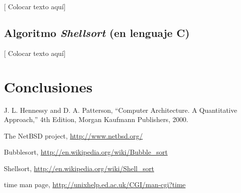 \documentclass{article}
\begin{document}
	[ Colocar texto aquí]

\lstset{ language = C } %
 
\bigskip\bigskip


\lstset{ language = C } %
 
\bigskip\bigskip




\subsection{Algoritmo \textit{Shellsort} (en lenguaje C)}

	[ Colocar texto aquí]

\lstset{ language = C } %
 
\bigskip\bigskip


\lstset{ language = C } %
 
\bigskip\bigskip




\section{Conclusiones}


\bigskip





\begin{thebibliography}{99}

	 J. L. Hennessy and D. A. Patterson, ``Computer Architecture. A Quantitative
	Approach,'' 4th Edition, Morgan Kaufmann Publishers, 2000.

	 The NetBSD project, \url{http://www.netbsd.org/}

	 Bubblesort, \url{http://en.wikipedia.org/wiki/Bubble_sort}

	 Shellsort, \url{http://en.wikipedia.org/wiki/Shell_sort}

	 time man page, \url{http://unixhelp.ed.ac.uk/CGI/man-cgi?time}

	\end{thebibliography}
\end{document}
